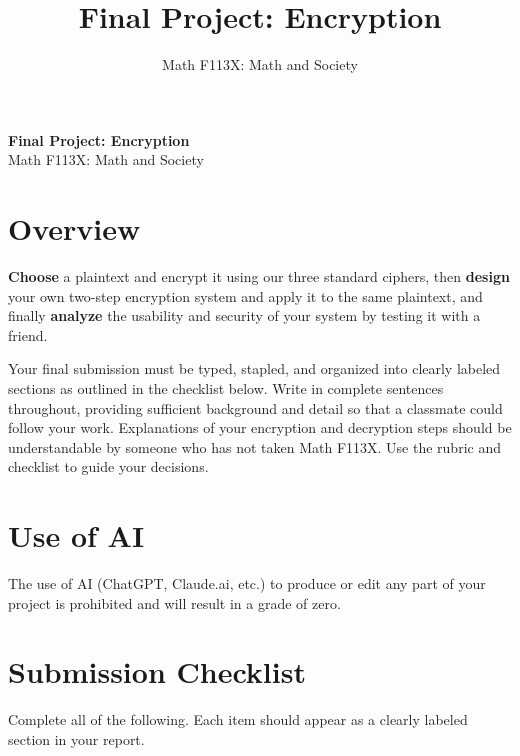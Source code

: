 \documentclass[11pt]{article}
\title{\textbf{Final Project: Encryption}}
\author{Math F113X: Math and Society}
\date{}
\begin{document}
\begin{center}{\large\textbf{Final Project: Encryption}}\\[2pt]
Math F113X: Math and Society \end{center}

\vspace{-4pt}
\section*{\normalsize Overview}
\vspace{-4pt}
\textbf{Choose} a plaintext and encrypt it using our three standard ciphers, then \textbf{design} your own two-step encryption system and apply it to the same plaintext, and finally \textbf{analyze} the usability and security of your system by testing it with a friend.

Your final submission must be typed, stapled, and organized into clearly labeled sections as outlined in the checklist below. Write in complete sentences throughout, providing sufficient background and detail so that a classmate could follow your work. Explanations of your encryption and decryption steps should be understandable by someone who has not taken Math F113X. Use the rubric and checklist to guide your decisions.

\section*{\normalsize Use of AI}
\vspace{-4pt}
The use of AI (ChatGPT, Claude.ai, etc.) to produce or edit any part of your project is prohibited and will result in a grade of zero.

\section*{\normalsize Submission Checklist}
\vspace{-4pt}

\noindent Complete all of the following. Each item should appear as a clearly labeled section in your report.
\end{document}
